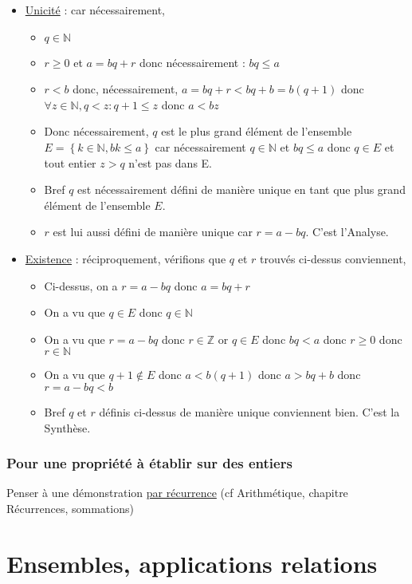 \documentclass[12pt,a4paper,french]{book}
\begin{document}
\begin{itemize}
\begin{itemize}
		\item \underline{Unicité} : car nécessairement,
		\begin{itemize}
			\item $q \in \mathbb{N}$
			\item $r \geqslant 0$ et $a = bq+r$ donc nécessairement : $bq \leqslant a$
			\item $r < b$ donc, nécessairement, $a = bq+r < bq+b = b(q+1)$ donc $\forall z \in \mathbb{N}, q < z : q+1 \leqslant z$ donc $a < bz$
			\item Donc nécessairement, $q$ est le plus grand élément de l'ensemble  $E = \left\lbrace k \in \mathbb{N}, bk \leqslant a \right\rbrace$ car nécessairement $q \in \mathbb{N}$ et $bq \leqslant a$ donc $q \in E$ et tout entier $z > q$ n'est pas dans E.
			\item Bref $q$ est nécessairement défini de manière unique en tant que plus grand élément de l'ensemble $E$.
			\item $r$ est lui aussi défini de manière unique car $r =a-bq$. C'est l'Analyse.
		\end{itemize}
		\item \underline{Existence} : réciproquement, vérifions que $q$ et $r$ trouvés ci-dessus conviennent,
		\begin{itemize}
			\item Ci-dessus, on a $r= a-bq$ donc $a = bq+r$
			\item On a vu que $q \in E$ donc $q \in \mathbb{N}$
			\item On a vu que $r = a-bq$ donc $r \in \mathbb{Z}$ or $q \in E$ donc $bq < a$ donc $ r\geqslant 0$ donc $r \in \mathbb{N}$
			\item On a vu que $q+1 \notin E$ donc $a < b(q+1)$ donc $a >bq+b$ donc $r = a-bq <b$
			\item Bref $q$ et $r$ définis ci-dessus de manière unique conviennent bien. C'est la Synthèse.
		\end{itemize}
	\end{itemize}
\end{itemize}
\subsection{Pour une propriété à établir sur des entiers}

Penser à une démonstration \underline{par récurrence} (cf Arithmétique, chapitre Récurrences, sommations)


\chapter{Ensembles, applications relations}	
\end{document}
